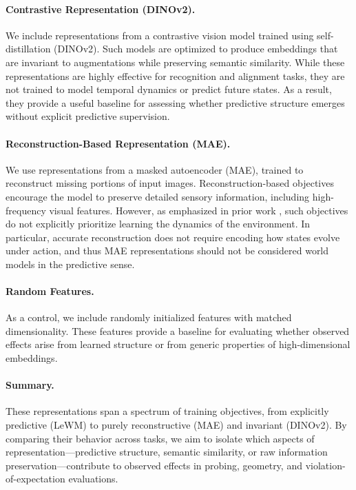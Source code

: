 \documentclass[10pt,twocolumn]{article}
\begin{document}
\paragraph{Contrastive Representation (DINOv2).}
We include representations from a contrastive vision model trained using self-distillation (DINOv2). Such models are optimized to produce embeddings that are invariant to augmentations while preserving semantic similarity. While these representations are highly effective for recognition and alignment tasks, they are not trained to model temporal dynamics or predict future states. As a result, they provide a useful baseline for assessing whether predictive structure emerges without explicit predictive supervision.

\paragraph{Reconstruction-Based Representation (MAE).}
We use representations from a masked autoencoder (MAE), trained to reconstruct missing portions of input images. Reconstruction-based objectives encourage the model to preserve detailed sensory information, including high-frequency visual features. However, as emphasized in prior work \citep{lecun2023jepa}, such objectives do not explicitly prioritize learning the dynamics of the environment. In particular, accurate reconstruction does not require encoding how states evolve under action, and thus MAE representations should not be considered world models in the predictive sense.

\paragraph{Random Features.}
As a control, we include randomly initialized features with matched dimensionality. These features provide a baseline for evaluating whether observed effects arise from learned structure or from generic properties of high-dimensional embeddings.

\paragraph{Summary.}
These representations span a spectrum of training objectives, from explicitly predictive (LeWM) to purely reconstructive (MAE) and invariant (DINOv2). By comparing their behavior across tasks, we aim to isolate which aspects of representation---predictive structure, semantic similarity, or raw information preservation---contribute to observed effects in probing, geometry, and violation-of-expectation evaluations.
\end{document}

